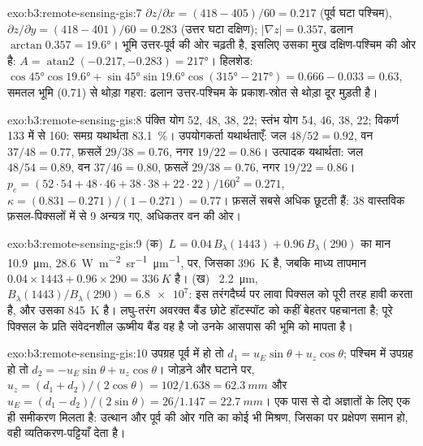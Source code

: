 \begin{solution}{exo:b3:remote-sensing-gis:7}
$\partial z/\partial x = (418 - 405)/60 = 0.217$ (पूर्व घटा पश्चिम),
$\partial z/\partial y = (418 - 401)/60 = 0.283$ (उत्तर घटा दक्षिण);
$|\nabla z| = 0.357$, ढलान $\arctan 0.357 = \ang{19.6}$। भूमि
उत्तर-पूर्व की ओर चढ़ती है, इसलिए उसका मुख दक्षिण-पश्चिम की ओर है: $A =
\operatorname{atan2}(-0.217, -0.283) = \ang{217}$। हिलशेड: $\cos\ang{45}
\cos\ang{19.6} + \sin\ang{45}\sin\ang{19.6}\cos(\ang{315} - \ang{217}) =
0.666 - 0.033 = 0.63$, समतल भूमि (0.71) से थोड़ा गहरा: ढलान
उत्तर-पश्चिम के प्रकाश-स्रोत से थोड़ा दूर मुड़ती है।
\end{solution}

\begin{solution}{exo:b3:remote-sensing-gis:8}
पंक्ति योग 52, 48, 38, 22; स्तंभ योग 54, 46, 38, 22; विकर्ण 133 में से
160: समग्र यथार्थता \qty{83.1}{\percent}। उपयोगकर्ता यथार्थताएँ: जल
$48/52 = 0.92$, वन $37/48 = 0.77$, फ़सलें $29/38 = 0.76$, नगर
$19/22 = 0.86$। उत्पादक यथार्थता: जल $48/54 = 0.89$, वन $37/46 = 0.80$,
फ़सलें $29/38 = 0.76$, नगर $19/22 = 0.86$। $p_e = (52\cdot54 + 48\cdot46 +
38\cdot38 + 22\cdot22)/160^2 = 0.271$, $\kappa = (0.831 - 0.271)/(1 -
0.271) = 0.77$। फ़सलें सबसे अधिक छूटती हैं: 38 वास्तविक फ़सल-पिक्सलों में से 9
अन्यत्र गए, अधिकतर वन की ओर।
\end{solution}

\begin{solution}{exo:b3:remote-sensing-gis:9}
(क)~$L = 0.04\,B_\lambda(1443) + 0.96\,B_\lambda(290)$ का मान
\qty{10.9}{\micro\metre}, \qty{28.6}{W.m^{-2}.sr^{-1}.\micro\metre^{-1}},
पर, जिसका  \qty{396}{K} है, जबकि माध्य तापमान
$0.04\times1443 + 0.96\times290 = \qty{336}{K}$ है। (ख)~
\qty{2.2}{\micro\metre}, $B_\lambda(1443)/B_\lambda(290) = \num{6.8e7}$:
इस तरंगदैर्घ्य पर लावा पिक्सल को पूरी तरह हावी करता है, और उसका 
\qty{845}{K} है। लघु-तरंग अवरक्त बैंड छोटे हॉटस्पॉट को कहीं
बेहतर पहचानता है; पूरे पिक्सल के प्रति संवेदनशील ऊष्मीय बैंड वह है जो
उनके आसपास की भूमि को मापता है।
\end{solution}

\begin{solution}{exo:b3:remote-sensing-gis:10}
उपग्रह पूर्व में हो तो $d_1 = u_E\sin\theta + u_z\cos\theta$; पश्चिम में
उपग्रह हो तो $d_2 = -u_E\sin\theta + u_z\cos\theta$। जोड़ने और घटाने पर,
$u_z = (d_1 + d_2)/(2\cos\theta) = 102/1.638 = \qty{62.3}{mm}$ और $u_E =
(d_1 - d_2)/(2\sin\theta) = 26/1.147 = \qty{22.7}{mm}$। एक पास से दो अज्ञातों
के लिए एक ही समीकरण मिलता है: उत्थान और पूर्व की ओर गति का कोई भी मिश्रण, जिसका
 पर प्रक्षेपण समान हो, वही व्यतिकरण-पट्टियाँ देता है।
\end{solution}

